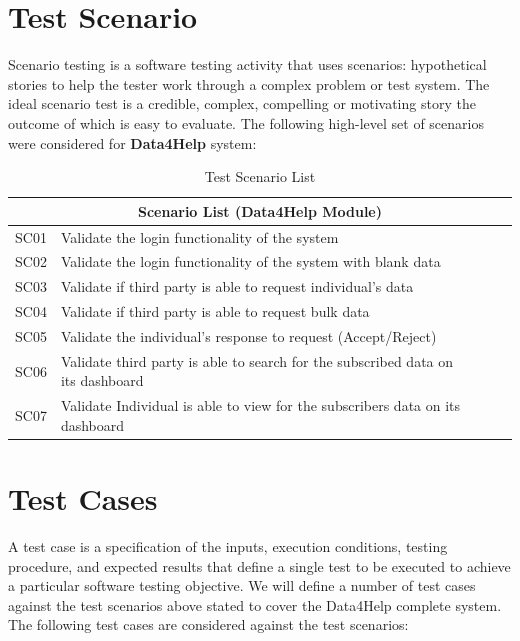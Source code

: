 \documentclass[a4paper, hidelinks, 12pt]{report}
\begin{document}
	\section{Test Scenario}
Scenario testing is a software testing activity that uses scenarios: hypothetical stories to help the tester work through a complex problem or test system. The ideal scenario test is a credible, complex, compelling or motivating story the outcome of which is easy to evaluate. The following high-level set of scenarios were considered for \textbf{Data4Help} system:
\begin{table}[htbp]
  \centering
  \caption{Test Scenario List}
    \begin{tabular}{|l|lrll|}
   \multicolumn{5}{c}{\textbf{Scenario List (Data4Help Module)}} \\
    \midrule
  SC01  & Validate the login functionality of the system &       &       &  \\
   SC02  & Validate the login functionality of the system with blank data &       &       &  \\
    SC03  & Validate if third party is able to request individual's data  &       &       &  \\
    SC04  & Validate if third party is able to request bulk data  &       &       &  \\
    SC05  & Validate the individual's response to request (Accept/Reject) &       &       &  \\
    SC06  & Validate third party is able to search for the subscribed data on its dashboard &       &       &  \\
    SC07  & Validate Individual is able to view for the subscribers data on its dashboard &       &       &  \\
    \bottomrule
    \end{tabular}%
  \label{tab:Test Scenario List}%
\end{table}%


	\section{Test Cases}
	A  test case is a specification of the inputs, execution conditions, testing procedure, and expected results that define a single test to be executed to achieve a particular software testing objective. We will define a number of test cases against the test scenarios above stated to cover the Data4Help complete system. The following test cases are considered against the test scenarios:
\end{document}
